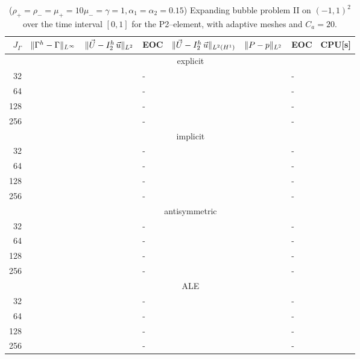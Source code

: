 \begin{table}
\center
\hspace*{-3.25cm}
\begin{tabular}{rllllllr}
\hline
$J_\Gamma$ & $\|\Gamma^h - \Gamma\|_{L^\infty}$ & $\|\vec U - I^h_{2}\,\vec u\|_{L^2}$ & EOC & $\|\vec U - I^h_{2}\,\vec u\|_{L^2(H^1)}$ & $\|P - p\|_{L^2}$ & EOC
& CPU[s] \\
\hline
& \multicolumn{7}{c}{explicit} \\
\hline
 32 & & & - & & & - & \\
 64 & & & - & & & - & \\
128 & & & - & & & - & \\
256 & & & - & & & - & \\
\hline
& \multicolumn{7}{c}{implicit} \\
\hline
 32 & & & - & & & - & \\
 64 & & & - & & & - & \\
128 & & & - & & & - & \\
256 & & & - & & & - & \\
\hline
& \multicolumn{7}{c}{antisymmetric} \\
\hline
 32 & & & - & & & - & \\
 64 & & & - & & & - & \\
128 & & & - & & & - & \\
256 & & & - & & & - & \\
\hline
& \multicolumn{7}{c}{ALE} \\
\hline
 32 & & & - & & & - & \\
 64 & & & - & & & - & \\
128 & & & - & & & - & \\
256 & & & - & & & - & \\
\hline
\end{tabular}
\hspace*{-3.25cm}
\caption[Navier--Stokes expanding bubble II errors P2--\pdg]
{($\rho_+ = \rho_- = \mu_+ = 10\mu_- = \gamma = 1,\alpha_1=\alpha_2=0.15$)
Expanding bubble problem II on $(-1,1)^2$ over the time interval $[0,1]$ for
the P2--\pdg element, with adaptive meshes and $C_a=20$\textdegree.}
\label{tab:nsexpandingbubbleIIp2p1dg}
\end{table}

